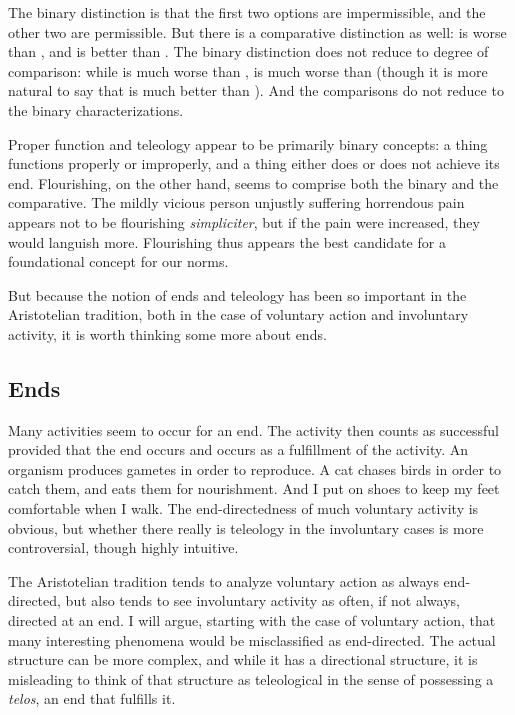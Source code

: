 
The binary distinction is that
the first two options are impermissible, and the other two are permissible. But there is a comparative distinction
as well:  is worse than , and  is better than . The binary distinction does not reduce to
degree of comparison: while  is much worse than ,  is much worse than  (though 
it is more natural to say that  is much better than ). And the comparisons do not reduce to the binary 
characterizations.

Proper function and teleology appear to be primarily binary concepts: a thing functions properly or improperly, and a thing either 
does or does not achieve its end. Flourishing, on the other hand, seems to comprise both the binary and the comparative. The mildly
vicious person unjustly suffering horrendous pain appears not to be flourishing \textit{simpliciter}, but if the pain were increased,
they would languish more. Flourishing thus appears the best candidate for a foundational concept for our norms.

But because the notion of ends and teleology has been so important in the Aristotelian tradition, both in the case of voluntary 
action and involuntary activity, it is worth thinking some more about ends.

\subsection{Ends}
Many activities seem to occur for an end. The activity then counts as successful provided that the end occurs and occurs as a
fulfillment of the activity. An organism produces gametes in order to reproduce. A cat chases birds in order to catch them,
and eats them for nourishment. And I put on shoes to keep my feet comfortable when I walk. The end-directedness of much voluntary
activity is obvious, but whether there really is teleology in the involuntary cases is more controversial, though highly intuitive.

The Aristotelian tradition tends to analyze voluntary action as always end-directed, but also tends to see involuntary activity as 
often, if not always, directed at an end. I will argue, starting with the case of voluntary action, that many interesting phenomena 
would be misclassified as end-directed. The actual structure can be more complex, and while it has a directional structure, it is
misleading to think of that structure as teleological in the sense of possessing a \textit{telos}, an end that fulfills it.


